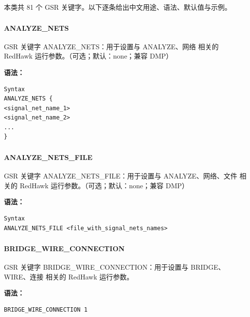 本类共 81 个 GSR 关键字。以下逐条给出中文用途、语法、默认值与示例。

\subsubsection{}
\paragraph*{ANALYZE_NETS}

GSR 关键字 ANALYZE_NETS：用于设置与 ANALYZE、网络 相关的 RedHawk 运行参数。（可选；默认：none；兼容 DMP）

\textbf{语法：}
\begin{lstlisting}
Syntax
ANALYZE_NETS {
<signal_net_name_1>
<signal_net_name_2>
...
}
\end{lstlisting}

\subsubsection{}
\paragraph*{ANALYZE_NETS_FILE}

GSR 关键字 ANALYZE_NETS_FILE：用于设置与 ANALYZE、网络、文件 相关的 RedHawk 运行参数。（可选；默认：none；兼容 DMP）

\textbf{语法：}
\begin{lstlisting}
Syntax
ANALYZE_NETS_FILE <file_with_signal_nets_names>
\end{lstlisting}

\subsubsection{}
\paragraph*{BRIDGE_WIRE_CONNECTION}

GSR 关键字 BRIDGE_WIRE_CONNECTION：用于设置与 BRIDGE、WIRE、连接 相关的 RedHawk 运行参数。

\textbf{语法：}
\begin{lstlisting}
BRIDGE_WIRE_CONNECTION 1
\end{lstlisting}

\subsubsection{}
